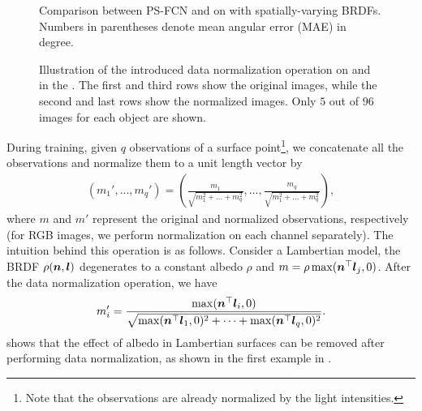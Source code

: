 \begin{figure}[tbp] \centering
    
    \caption[Comparison between PS-FCN and \PSFCNplusN on  with SVBRDF]{Comparison between PS-FCN and \PSFCNplusN on  with spatially-varying BRDFs. Numbers in parentheses denote mean angular error (MAE) in degree.} \label{fig:cat_SVBRDF}
\end{figure}

\begin{figure}[t] \centering
    
    \caption[Illustration of the introduced data normalization operation]{Illustration of the introduced data normalization operation on  and  in the \diligent. The first and third rows show the original images, while the second and last rows show the normalized images. Only $5$ out of $96$ images for each object are shown.} \label{fig:normalization_SVBRDF}
\end{figure}

During training, given $q$ observations of a surface point\footnote{Note that the observations are already normalized by the light intensities.}, we concatenate all the observations and normalize them to a unit length vector by
\begin{align}
    \label{eq:normalize}
    \left(m_1', ..., m_{q}'\right) = \left(\frac{m_1}{\sqrt{m_1^2+...+m_{q}^2}}, ..., \frac{m_{q}}{\sqrt{m_1^2+...+m_{q}^2}}\right),
\end{align}
where $m$ and $m'$ represent the original and normalized observations, respectively (for RGB images, we perform normalization on each channel separately). 
The intuition behind this operation is as follows. Consider a Lambertian model, the BRDF $\rho(\boldsymbol{n}, \boldsymbol{l})$ degenerates to a constant albedo $\rho$ and $m = \rho \max(\boldsymbol{n}^\top \boldsymbol{l}_j, 0)$. 
After the data normalization operation, we have
\begin{align}
    \label{eq:normalize2}
    m_{i}' = \frac{\max(\boldsymbol{n}^\top \boldsymbol{l}_i, 0)}{\sqrt{\max(\boldsymbol{n}^\top \boldsymbol{l}_1, 0)^2 + \cdots + \max(\boldsymbol{n}^\top \boldsymbol{l}_q, 0)^2}}.
\end{align}
 shows that the effect of albedo in Lambertian surfaces can be removed after performing data normalization, as shown in the first example in .

